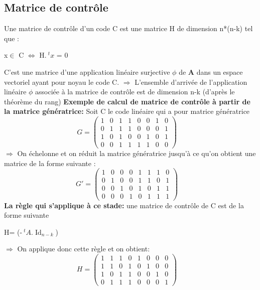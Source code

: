 \documentclass[french,nochapter,11pt]{rapportUB}
\begin{document}
\subsection{Matrice de contrôle}
Une matrice de contrôle d'un code C est une matrice H de dimension n*(n-k) tel que :\newline
\begin{tabbing}
  \hspace{3cm}x$\in$ C $\iff$ H.{$~^tx$} = 0 \\
  \end{tabbing}
C'est une matrice d'une application linéaire surjective $\phi$ de \textbf{A} dans un espace vectoriel ayant pour noyau le code C. \newline
$\Rightarrow$ L'ensemble d'arrivée de l'application linéaire $\phi$ associée à la matrice de contrôle est de dimension n-k (d'après le théorème du rang)\newline
\textbf{Exemple de calcul de matrice de contrôle à partir de la matrice génératrice:} \newline
Soit C le code linéaire qui a pour matrice génératrice
$$G=
\begin{pmatrix}
  1 & 0 & 1 & 1 & 0 & 0 & 1 & 0  \\
  0 & 1 & 1 & 1 & 0 & 0 & 0 & 1  \\
  1 & 0 & 1 & 0 & 0 & 1 & 0 & 1  \\
  0 & 0 & 1 & 1 & 1 & 1 & 0 & 0 
  
  
\end{pmatrix}
\quad
$$
$\Rightarrow$ On échelonne et on réduit la matrice génératrice jusqu'à ce qu'on obtient une matrice de la forme suivante : \newline
$$G'=
\begin{pmatrix}
  1 & 0 & 0 & 0 & 1 & 1 & 1 & 0  \\
  0 & 1 & 0 & 0 & 1 & 1 & 0 & 1  \\
  0 & 0 & 1 & 0 & 1 & 0 & 1 & 1  \\
  0 & 0 & 0 & 1 & 0 & 1 & 1 & 1 
  
  
\end{pmatrix}
\quad
$$
\textbf{La règle qui s'applique à ce stade:} une matrice de contrôle de C est de la forme suivante \newline
\begin{tabbing}
  \hspace{3cm}H= (-$~^tA$.$\operatorname{Id}_{n-k}$)\\
\end{tabbing}
$\Rightarrow$ On applique donc cette règle et on obtient:
$$H=
\begin{pmatrix}
  1 & 1 & 1 & 0 & 1 & 0 & 0 & 0  \\
  1 & 1 & 0 & 1 & 0 & 1 & 0 & 0  \\
  1 & 0 & 1 & 1 & 0 & 0 & 1 & 0  \\
  0 & 1 & 1 & 1 & 0 & 0 & 0 & 1 
  
  
\end{pmatrix}
\quad
$$
\end{document}
